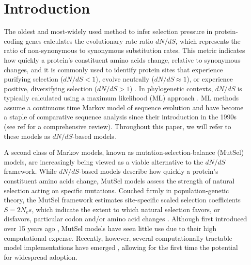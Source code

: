 \documentclass[11pt]{article}
\begin{document}
\section*{Introduction}
		
The oldest and most-widely used method to infer selection pressure in protein-coding genes calculates the evolutionary rate ratio $dN/dS$, which represents the ratio of non-synonymous to synonymous substitution rates. This metric indicates how quickly a protein's constituent amino acids change, relative to synonymous changes, and it is commonly used to identify protein sites that experience purifying selection ($dN/dS<1$), evolve neutrally ($dN/dS\approx1$), or experience positive, diversifying selection ($dN/dS>1$) \citep{NielsenYang1998, Yangetal2000, KosakovskyPondFrost2005b, Huelsenbecketal2006}. In phylogenetic contexts, $dN/dS$ is typically calculated using a maximum likelihood (ML) approach \citep{GoldmanYang1994,MuseGaut1994,NielsenYang1998,Yang2006}. ML methods assume a continuous time Markov model of sequence evolution and have become a staple of comparative sequence analysis since their introduction in the 1990s (see ref \citep{Anisimova2009} for a comprehensive review). Throughout this paper, we will refer to these models as $dN/dS$-based models. 

A second class of Markov models, known as mutation-selection-balance (MutSel) models, are increasingly being viewed as a viable alternative to the $dN/dS$ framework. While $dN/dS$-based models describe how quickly a protein's constituent amino acids change, MutSel models assess the strength of natural selection acting on specific mutations. Couched firmly in population-genetic theory, the MutSel framework estimates site-specific scaled selection coefficients $S=2N_es$, which indicate the extent to which natural selection favors, or disfavors, particular codon and/or amino acid changes \citep{HalpernBruno1998,YangNielsen2008,Rodrigueetal2010,Tamurietal2012}. Although first introduced over 15 years ago \citep{HalpernBruno1998}, MutSel models have seen little use due to their high computational expense. Recently, however, several computationally tractable model implementations have emerged \citep{RodrigueLartillot2014,Tamurietal2014}, allowing for the first time the potential for widespread adoption.		
		
\end{document}
